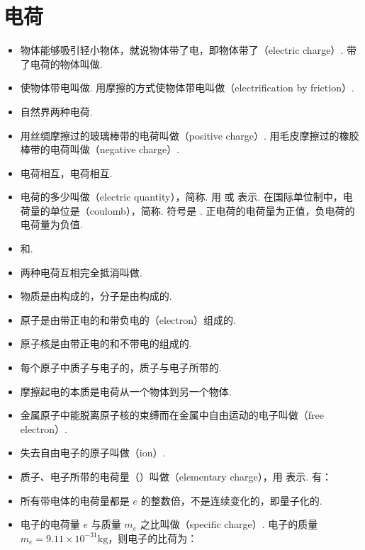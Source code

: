 \section{电荷}

\vspace{10pt}
\begin{itemize}
\item 物体能够吸引轻小物体，就说物体带了电，即物体带了（electric charge）. 带了电荷的物体叫做.
\item 使物体带电叫做. 用摩擦的方式使物体带电叫做（electrification by friction）.
\item 自然界两种电荷.
\item 用丝绸摩擦过的玻璃棒带的电荷叫做（positive charge）. 用毛皮摩擦过的橡胶棒带的电荷叫做（negative charge）.
\item {}电荷相互，电荷相互.
\item 电荷的多少叫做（electric quantity），简称. 用  或  表示. 在国际单位制中，电荷量的单位是（coulomb），简称. 符号是 . 正电荷的电荷量为正值，负电荷的电荷量为负值.
\item {}和.
\item 两种电荷互相完全抵消叫做.
\item 物质是由构成的，分子是由构成的.
\item 原子是由带正电的和带负电的（electron）组成的.
\item 原子核是由带正电的和不带电的组成的.
\item 每个原子中质子与电子的，质子与电子所带的.
\item 摩擦起电的本质是电荷从一个物体到另一个物体.
\item 金属原子中能脱离原子核的束缚而在金属中自由运动的电子叫做（free electron）.
\item 失去自由电子的原子叫做（ion）.
\item 质子、电子所带的电荷量（）叫做（elementary charge），用  表示. 有：
\item 所有带电体的电荷量都是 $e$ 的整数倍，不是连续变化的，即量子化的.
\item 电子的电荷量 $e$ 与质量 $m_e$ 之比叫做（specific charge）. 电子的质量 $m_e=9.11\times10^{-31}\text{kg}$，则电子的比荷为：

\end{itemize}
